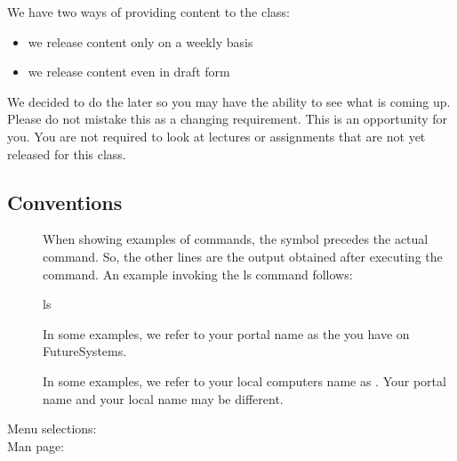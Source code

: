 We have two ways of providing content to the class:
\begin{itemize}
\item {} 
we release content only on a weekly basis

\item {} 
we release content even in draft form

\end{itemize}

We decided to do the later so you may have the ability to see what is
coming up. Please do not mistake this as a changing requirement. This
is an opportunity for you. You are not required to look at lectures or
assignments that are not yet released for this class.


\subsection{Conventions}
\label{\detokenize{i524/preface/convention::doc}}\label{\detokenize{i524/preface/convention:conventions}}\begin{description}
\item[{\sphinxtitleref{\$}}] \leavevmode
When showing examples of commands, the \sphinxtitleref{\$} symbol precedes the
actual command. So, the other lines are the output obtained after
executing the command. An example invoking the ls command
follows:

\begin{sphinxVerbatim}[commandchars=\\\{\}]
\PYGZdl{} ls
\end{sphinxVerbatim}

\item[{}] \leavevmode
In some examples, we refer to your portal name as the 
you have on FutureSystems.

\item[{}] \leavevmode
In some examples, we refer to your local computers name as
. Your portal name and your local name may be
different.

\item[{Menu selections:}] \leavevmode
{}

\item[{Man page:}] \leavevmode
{}

\end{description}


